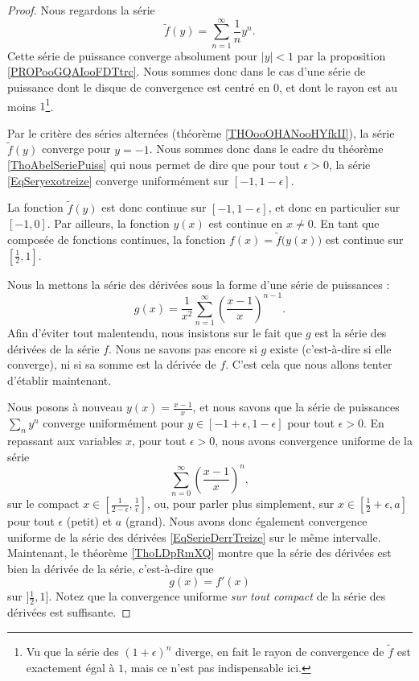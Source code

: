 \begin{proof}
	Nous regardons la série
	\begin{equation}		\label{EqSeryexotreize}
		\tilde f(y)=\sum_{n=1}^{\infty}\frac{1}{ n }y^n.
	\end{equation}
	Cette série de puissance converge absolument pour \( | y |<1\) par la proposition \ref{PROPooGQAIooFDTtrc}. Nous sommes donc dans le cas d'une série de puissance dont le disque de convergence est centré en \( 0\), et dont le rayon est au moins \( 1\)\footnote{Vu que la série des \( (1+\epsilon)^n\)  diverge, en fait le rayon de convergence de \( \tilde  f\) est exactement égal à \( 1\), mais ce n'est pas indispensable ici.}.

	Par le critère des séries alternées (théorème \ref{THOooOHANooHYfkII}), la série \( \tilde f(y) \)  converge pour \( y=-1\). Nous sommes donc dans le cadre du théorème \ref{ThoAbelSeriePuiss} qui nous permet de dire que pour tout \( \epsilon>0\), la série \eqref{EqSeryexotreize} converge uniformément sur \( [-1,1-\epsilon]\).

	La fonction \( \tilde f(y)\) est donc continue sur \( [-1,1-\epsilon]\), et donc en particulier sur \( [-1,0]\). Par ailleurs, la fonction \( y(x)\) est continue en \( x\neq 0\). En tant que composée de fonctions continues, la fonction \( f(x)=\tilde f\big( y(x) \big)\) est continue sur \( [\frac{ 1 }{2},1]\).

	Nous la mettons la série des dérivées sous la forme d'une série de puissances :
	\begin{equation}		\label{EqSerieDerrTreize}
		g(x)=\frac{1}{ x^2 }\sum_{n=1}^{\infty} \left( \frac{ x-1 }{ x } \right)^{n-1}.
	\end{equation}
	Afin d'éviter tout malentendu, nous insistons sur le fait que \( g\) est la série des dérivées de la série \( f\). Nous ne savons pas encore si \( g\) existe (c'est-à-dire si elle converge), ni si sa somme est la dérivée de \( f\). C'est cela que nous allons tenter d'établir maintenant.

	Nous posons à nouveau \( y(x)=\frac{ x-1 }{ x }\), et nous savons que la série de puissances \( \sum_ny^n\) converge uniformément pour \( y\in[-1+\epsilon,1-\epsilon]\) pour tout \( \epsilon>0\). En repassant aux variables \( x\), pour tout \( \epsilon>0\), nous avons convergence uniforme de la série
	\begin{equation}
		\sum_{n=0}^{\infty} \left( \frac{ x-1 }{ x } \right)^n,
	\end{equation}
	sur le compact \( x\in[\frac{ 1 }{ 2-\epsilon },\frac{1}{ \epsilon }]\), ou, pour parler plus simplement, sur \( x\in[\frac{ 1 }{2}+\epsilon,a]\) pour tout \( \epsilon\) (petit) et \( a\) (grand). Nous avons donc également convergence uniforme de la série des dérivées \eqref{EqSerieDerrTreize} sur le même intervalle. Maintenant, le théorème \ref{ThoLDpRmXQ} montre que la série des dérivées est bien la dérivée de la série, c'est-à-dire que
	\begin{equation}
		g(x)=f'(x)
	\end{equation}
	sur \( ]\frac{ 1 }{ 2 },1]\). Notez que la convergence uniforme \emph{sur tout compact} de la série des dérivées est suffisante.


\end{proof}
